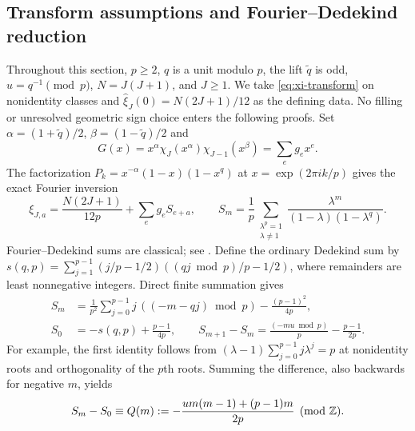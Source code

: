 \subsection{Transform assumptions and Fourier--Dedekind reduction}
Throughout this section, $p\geq2$, $q$ is a unit modulo $p$, the lift
$\widetilde q$ is odd, $u=q^{-1}\pmod p$, $N=J(J+1)$, and $J\geq1$.
We take \eqref{eq:xi-transform} on nonidentity classes and
$\widehat\xi_J(0)=N(2J+1)/12$ as the defining data.  No filling or
unresolved geometric sign choice enters the following proofs.
Set $\alpha=(1+\widetilde q)/2$, $\beta=(1-\widetilde q)/2$ and
\[
 G(x)=x^\alpha\chi_J(x^\alpha)\chi_{J-1}(x^\beta)
     =\sum_e g_e x^e .
\]
The factorization $P_k=x^{-\alpha}(1-x)(1-x^q)$ at $x=\exp(2\pi ik/p)$
gives the exact Fourier inversion
\begin{equation}\label{eq:fd-inversion}
 \xi_{J,a}=\frac{N(2J+1)}{12p}+\sum_e g_e S_{e+a},\qquad
 S_m=\frac1p\sum_{\substack{\lambda^p=1\\\lambda\ne1}}
       \frac{\lambda^m}{(1-\lambda)(1-\lambda^q)}.
\end{equation}
Fourier--Dedekind sums are classical; see \cite{BeckRobins2004}.
Define the ordinary Dedekind sum by
$s(q,p)=\sum_{j=1}^{p-1}(j/p-1/2)((qj\bmod p)/p-1/2)$,
where remainders are least nonnegative integers.  Direct finite summation gives
\begin{align}
 S_m&=\frac1{p^2}\sum_{j=0}^{p-1}j\,((-m-qj)\bmod p)
                    -\frac{(p-1)^2}{4p},\\
 S_0&=-s(q,p)+\frac{p-1}{4p},\qquad
 S_{m+1}-S_m=\frac{(-mu\bmod p)}p-\frac{p-1}{2p}.
\end{align}
For example, the first identity follows from
$(\lambda-1)\sum_{j=0}^{p-1}j\lambda^j=p$ at nonidentity roots and
orthogonality of the $p$th roots.  Summing the difference, also backwards
for negative $m$, yields
\begin{equation}\label{eq:fd-quadratic}
 S_m-S_0\equiv Q(m):=-\frac{u m(m-1)+(p-1)m}{2p}\pmod{\mathbb{Z}}.
\end{equation}

